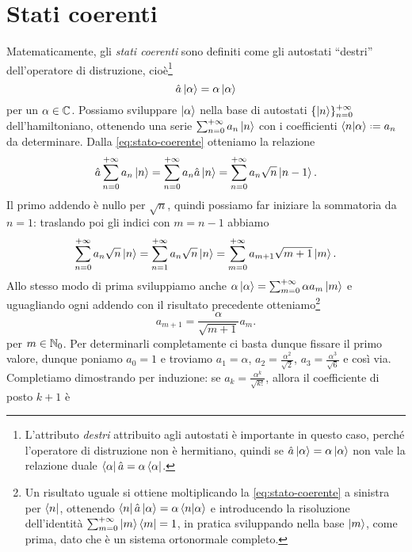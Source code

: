 \section{Stati coerenti}
Matematicamente, gli \emph{stati coerenti} sono definiti come gli autostati ``destri'' dell'operatore di distruzione, cioè\footnote{L'attributo \emph{destri} attribuito agli autostati è importante in questo caso, perch\'e l'operatore di distruzione non è hermitiano, quindi se $\hat{a}\left|{\alpha}\right\rangle=\alpha\left|{\alpha}\right\rangle$ non vale la relazione duale $\left\langle{\alpha}\right|\hat{a}=\alpha\left\langle{\alpha}\right|$.}
\begin{equation}
	\hat{a}\left|{\alpha}\right\rangle=\alpha\left|{\alpha}\right\rangle
	\label{eq:stato-coerente}
\end{equation}
per un $\alpha\in\mathbb{C}$.
Possiamo sviluppare $\left|{\alpha}\right\rangle$ nella base di autostati $\{\left|{n}\right\rangle\}_{n=0}^{+\infty}$ dell'hamiltoniano, ottenendo una serie $\sum_{n=0}^{+\infty}a_n\left|{n}\right\rangle$ con i coefficienti $\braket{n}{\alpha}\defeq a_n$ da determinare.
Dalla \eqref{eq:stato-coerente} otteniamo la relazione
\begin{equation}
	\hat{a}\sum_{n=0}^{+\infty}a_n\left|{n}\right\rangle=\sum_{n=0}^{+\infty}a_n\hat{a}\left|{n}\right\rangle=\sum_{n=0}^{+\infty}a_n\sqrt{n}\left|{n-1}\right\rangle.
\end{equation}
Il primo addendo è nullo per $\sqrt{n}$, quindi possiamo far iniziare la sommatoria da $n=1$: traslando poi gli indici con $m=n-1$ abbiamo
\begin{equation}
	\sum_{n=0}^{+\infty}a_n\sqrt{n}\left|{n}\right\rangle=\sum_{n=1}^{+\infty}a_n\sqrt{n}\left|{n}\right\rangle=\sum_{m=0}^{+\infty}a_{m+1}\sqrt{m+1}\left|{m}\right\rangle.
\end{equation}
Allo stesso modo di prima sviluppiamo anche $\alpha\left|{\alpha}\right\rangle=\sum_{m=0}^{+\infty}\alpha a_m\left|{m}\right\rangle$ e uguagliando ogni addendo con il risultato precedente otteniamo\footnote{Un risultato uguale si ottiene moltiplicando la \eqref{eq:stato-coerente} a sinistra per $\left\langle{n}\right|$, ottenendo $\left\langle{n}\right|\hat{a}\left|{\alpha}\right\rangle=\alpha\left\langle{n}\middle|{\alpha}\right\rangle$ e introducendo la risoluzione dell'identità $\sum_{m=0}^{+\infty}\left|{m}\right\rangle\left\langle{m}\right|=1$, in pratica sviluppando nella base $\left|{m}\right\rangle$, come prima, dato che è un sistema ortonormale completo.}
\begin{equation}
	a_{m+1}=\frac{\alpha}{\sqrt{m+1}}a_m.
	\label{eq:ricorrenza-stati-coerenti}
\end{equation}
per $m\in\mathbb{N}_0$.
Per determinarli completamente ci basta dunque fissare il primo valore, dunque poniamo $a_0=1$ e troviamo $a_1=\alpha$, $a_2=\frac{\alpha^2}{\sqrt{2}}$, $a_3=\frac{\alpha^3}{\sqrt{6}}$ e cos\`i via.
Completiamo dimostrando per induzione: se $a_k=\frac{\alpha^k}{\sqrt{k!}}$, allora il coefficiente di posto $k+1$ è
